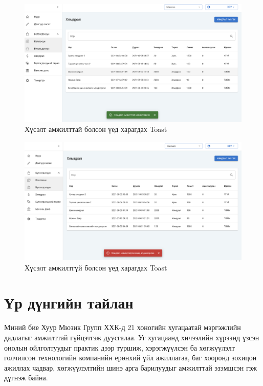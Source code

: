 \begin{figure}
	\centering
	\includegraphics[width=15cm]{images/toast-success.png}
	\caption{Хүсэлт амжилттай болсон үед харагдах Toast}
	\label{fig:toast-v1}
\end{figure}

\begin{figure}
	\centering
	\includegraphics[width=15cm]{images/toast-failed.png}
	\caption{Хүсэлт амжилтгүй болсон үед харагдах Toast}
	\label{fig:toast-v2}
\end{figure}

\pagebreak
\section{Үр дүнгийн тайлан}
Миний бие Хуур Мюзик Групп ХХК-д 21 хоногийн хугацаатай мэргэжлийн дадлагыг амжилттай гүйцэтгэж дуусгалаа. Уг хугацаанд хичээлийн хүрээнд үзсэн онолын ойлголтуудыг практик дээр туршиж, хэрэгжүүлсэн ба хөгжүүлэлт голчилсон технологийн компанийн ерөнхий үйл ажиллагаа, баг хооронд зохицон ажиллах чадвар, хөгжүүлэлтийн шинэ арга барилуудыг амжилттай эзэмшсэн гэж дүгнэж байна.

